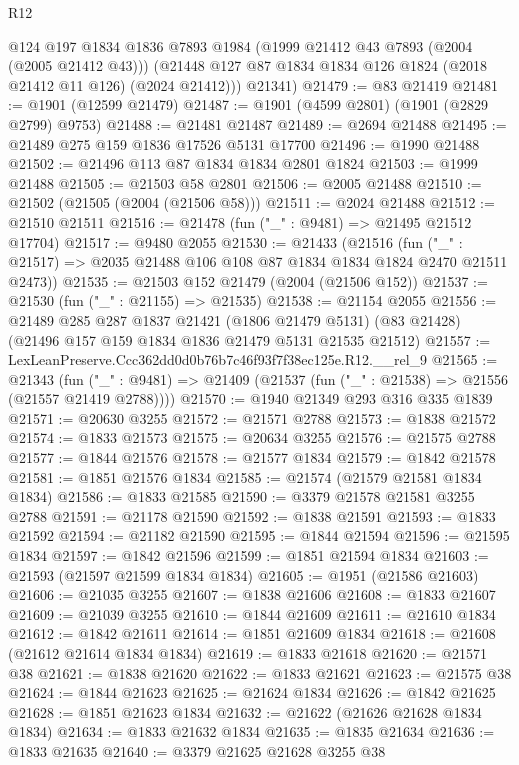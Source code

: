 \begin{lexlean}{R12}
\begin{coremodule}
        @124
        @197
        @1834
        @1836
        @7893
        @1984
        (@1999 @21412 @43 @7893 (@2004 (@2005 @21412 @43)))
        (@21448 @127 @87 @1834 @1834 @126 @1824 (@2018 @21412 @11 @126) (@2024 @21412)))
      @21341)
@21479 := @83 @21419
@21481 := @1901 (@12599 @21479)
@21487 := @1901 (@4599 @2801) (@1901 (@2829 @2799) @9753)
@21488 := @21481 @21487
@21489 := @2694 @21488
@21495 := @21489 @275 @159 @1836 @17526 @5131 @17700
@21496 := @1990 @21488
@21502 := @21496 @113 @87 @1834 @1834 @2801 @1824
@21503 := @1999 @21488
@21505 := @21503 @58 @2801
@21506 := @2005 @21488
@21510 := @21502 (@21505 (@2004 (@21506 @58)))
@21511 := @2024 @21488
@21512 := @21510 @21511
@21516 := @21478 (fun ("_" : @9481) => @21495 @21512 @17704)
@21517 := @9480 @2055
@21530 := @21433
    (@21516 (fun ("_" : @21517) => @2035 @21488 @106 @108 @87 @1834 @1834 @1824 @2470 @21511 @2473))
@21535 := @21503 @152 @21479 (@2004 (@21506 @152))
@21537 := @21530 (fun ("_" : @21155) => @21535)
@21538 := @21154 @2055
@21556 := @21489
    @285
    @287
    @1837
    @21421
    (@1806 @21479 @5131)
    (@83 @21428)
    (@21496 @157 @159 @1834 @1836 @21479 @5131 @21535 @21512)
@21557 := LexLeanPreserve.Ccc362dd0d0b76b7c46f93f7f38ec125e.R12.__rel_9
@21565 := @21343
    (fun ("_" : @9481) => @21409 (@21537 (fun ("_" : @21538) => @21556 (@21557 @21419 @2788))))
@21570 := @1940 @21349 @293 @316 @335 @1839
@21571 := @20630 @3255
@21572 := @21571 @2788
@21573 := @1838 @21572
@21574 := @1833 @21573
@21575 := @20634 @3255
@21576 := @21575 @2788
@21577 := @1844 @21576
@21578 := @21577 @1834
@21579 := @1842 @21578
@21581 := @1851 @21576 @1834
@21585 := @21574 (@21579 @21581 @1834 @1834)
@21586 := @1833 @21585
@21590 := @3379 @21578 @21581 @3255 @2788
@21591 := @21178 @21590
@21592 := @1838 @21591
@21593 := @1833 @21592
@21594 := @21182 @21590
@21595 := @1844 @21594
@21596 := @21595 @1834
@21597 := @1842 @21596
@21599 := @1851 @21594 @1834
@21603 := @21593 (@21597 @21599 @1834 @1834)
@21605 := @1951 (@21586 @21603)
@21606 := @21035 @3255
@21607 := @1838 @21606
@21608 := @1833 @21607
@21609 := @21039 @3255
@21610 := @1844 @21609
@21611 := @21610 @1834
@21612 := @1842 @21611
@21614 := @1851 @21609 @1834
@21618 := @21608 (@21612 @21614 @1834 @1834)
@21619 := @1833 @21618
@21620 := @21571 @38
@21621 := @1838 @21620
@21622 := @1833 @21621
@21623 := @21575 @38
@21624 := @1844 @21623
@21625 := @21624 @1834
@21626 := @1842 @21625
@21628 := @1851 @21623 @1834
@21632 := @21622 (@21626 @21628 @1834 @1834)
@21634 := @1833 @21632 @1834
@21635 := @1835 @21634
@21636 := @1833 @21635
@21640 := @3379 @21625 @21628 @3255 @38

\end{coremodule}
\end{lexlean}
